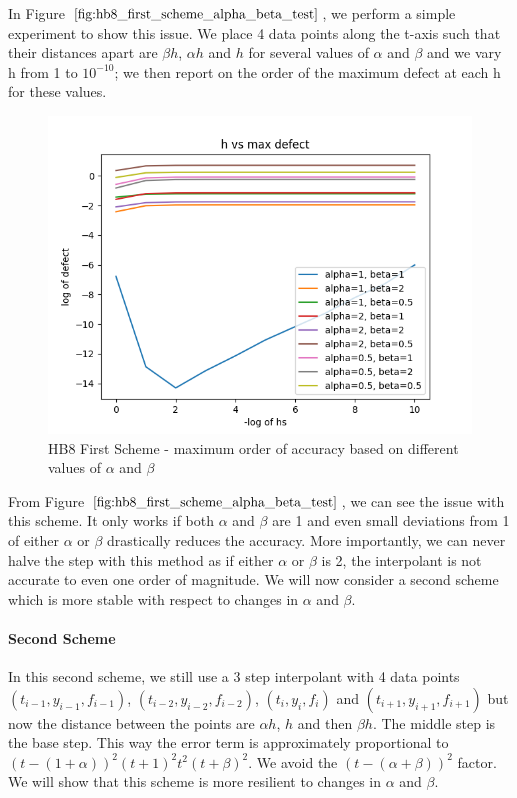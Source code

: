 \documentclass{article}
\begin{document}
In Figure $\ref{fig:hb8_first_scheme_alpha_beta_test}$, we perform a simple experiment to show this issue. We place 4 data points along the t-axis such that their distances apart are $\beta h$, $\alpha h$ and $h$ for several values of $\alpha$ and $\beta$ and we vary h from 1 to $10^{-10}$; we then report on the order of the maximum defect at each h for these values.

\begin{figure}[H]
\centering
\includegraphics[width=0.7\linewidth]{./figures/hb8_first_scheme_alpha_beta_test}
\caption{HB8 First Scheme - maximum order of accuracy based on different values of $\alpha$ and $\beta$}
\label{fig:hb8_first_scheme_alpha_beta_test}
\end{figure}

From Figure $\ref{fig:hb8_first_scheme_alpha_beta_test}$, we can see the issue with this scheme. It only works if both $\alpha$ and $\beta$ are 1 and even small deviations from 1 of either $\alpha$ or $\beta$ drastically reduces the accuracy. More importantly, we can never halve the step with this method as if either $\alpha$ or $\beta$ is 2, the interpolant is not accurate to even one order of magnitude. We will now consider a second scheme which is more stable with respect to changes in $\alpha$ and $\beta$.

\paragraph{Second Scheme}
In this second scheme, we still use a 3 step interpolant with 4 data points $(t_{i-1}, y_{i-1}, f_{i-1})$, $(t_{i-2}, y_{i-2}, f_{i-2})$, $(t_{i}, y_{i}, f_{i})$ and $(t_{i+1}, y_{i+1}, f_{i+1})$ but now the distance between the points are $\alpha h$, $h$ and then $\beta h$. The middle step is the base step. This way the error term is approximately proportional to $(t- (1+\alpha))^2(t+1)^2t^2(t+\beta)^2$. We avoid the $(t-(\alpha+\beta))^2$ factor. We will show that this scheme is more resilient to changes in $\alpha$ and $\beta$.
\end{document}
